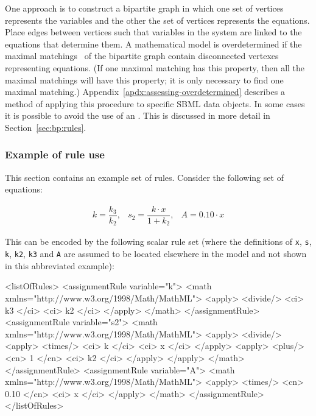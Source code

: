 One approach is to construct a bipartite graph in which
one set of vertices represents the variables and the other the set
of vertices represents the equations.  Place edges between
vertices such that variables in the system are linked to the
equations that determine them.  A mathematical model is 
overdetermined if the maximal matchings~\citep{chartrand_1977} 
of the bipartite graph contain disconnected vertexes representing 
equations.  (If one maximal matching has this property, then all the 
maximal matchings will have this property; \ie it is only necessary 
to find one maximal matching.)  
Appendix~\ref{apdx:assessing-overdetermined} describes
a method of applying this procedure to specific SBML data objects.
In some cases it is possible to avoid the use of an \AlgebraicRule. 
This is discussed in more detail in Section~\ref{sec:bp:rules}.


\subsubsection{Example of rule use}
\label{sec:eg-rule-use}

This section contains an example set of rules.  Consider the
following set of equations:
\begin{linenomath}
  \begin{equation*}
    \begin{array}{lll}
      k = \dfrac{k_3}{k_2}, & s_2 = \dfrac{k \cdot x}{1 + k_2}, & A = 0.10 \cdot x
    \end{array}
  \end{equation*}
\end{linenomath}
This can be encoded by the following scalar rule set (where the
definitions of \texttt{x}, \texttt{s}, \texttt{k}, \texttt{k2},
\texttt{k3} and \texttt{A} are assumed to be located elsewhere in
the model and not shown in this abbreviated example):

\begin{example}
<listOfRules>
    <assignmentRule variable="k">
        <math xmlns="http://www.w3.org/1998/Math/MathML">
            <apply> <divide/> <ci> k3 </ci> <ci> k2 </ci> </apply>
        </math>
    </assignmentRule>
    <assignmentRule variable="s2">
        <math xmlns="http://www.w3.org/1998/Math/MathML">
            <apply>
                <divide/>
                    <apply> <times/> <ci> k </ci> <ci> x </ci> </apply>
                    <apply> <plus/> <cn> 1 </cn> <ci> k2 </ci> </apply>
            </apply>
        </math>
    </assignmentRule>
    <assignmentRule variable="A">
        <math xmlns="http://www.w3.org/1998/Math/MathML">
            <apply> <times/> <cn> 0.10 </cn> <ci> x </ci> </apply>
        </math>
    </assignmentRule>
</listOfRules>
\end{example}


